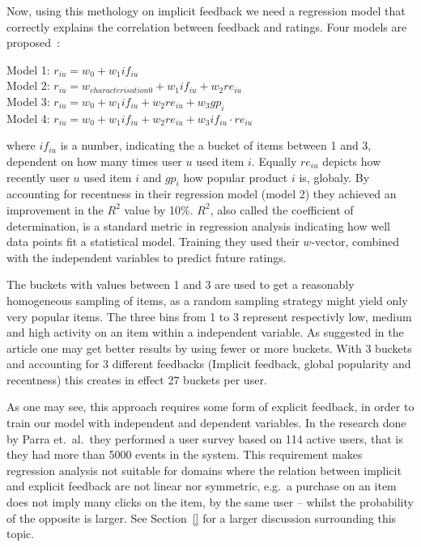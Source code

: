 Now, using this methology on implicit feedback we need a regression model that
correctly explains the correlation between feedback and ratings. Four models
are proposed~\cite{parra2011walk}:

\noindent
Model 1: $r_{iu} = w_0 + w_1 if_{iu}$ \\
Model 2: $r_{iu} = w_{characterisation0} + w_1 if_{iu} + w_2 re_{iu}$ \\
Model 3: $r_{iu} = w_0 + w_1 if_{iu} + w_2 re_{iu} + w_3 gp_{i}$ \\
Model 4: $r_{iu} = w_0 + w_1 if_{iu} + w_2 re_{iu} + w_3 if_{iu} \cdot re_{iu}$

where $if_{iu}$ is a number, indicating the a bucket of items between 1 and 3,
dependent on how many times user $u$ used item $i$. Equally $re_{iu}$ depicts
how recently user $u$ used item $i$ and $gp_{i}$ how popular product $i$ is,
globaly. By accounting for recentness in their regression model (model 2)
they achieved an improvement in the $R^2$ value by 10\%. $R^2$, also called the
coefficient of determination, is a standard metric in regression analysis
indicating how well data points fit a statistical model. Training they used
their $w$-vector, combined with the independent variables to predict future
ratings.

The buckets with values between 1 and 3 are used to get a reasonably
homogeneous sampling of items, as a random sampling strategy might yield only
very popular items. The three bins from 1 to 3 represent respectivly low,
medium and high activity on an item within a independent variable. As suggested
in the article one may get better results by using fewer or more buckets. With
3 buckets and accounting for 3 different feedbacks (Implicit feedback, global
popularity and recentness) this creates in effect 27 buckets per user.

As one may see, this approach requires some form of explicit feedback, in order
to train our model with independent and dependent variables. In the research
done by Parra et.\ al.\ they performed a user survey based on 114 active users,
that is they had more than 5000 events in the system. This requirement makes
regression analysis not suitable for domains where the relation between
implicit and explicit feedback are not linear nor symmetric, e.g.\ a purchase on
an item does not imply many clicks on the item, by the same user – whilst the
probability of the opposite is larger. See Section~\ref{} for a larger
discussion surrounding this topic. 


